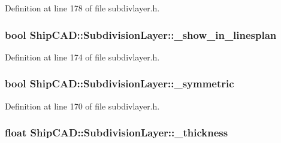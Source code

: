 Definition at line 178 of file subdivlayer.\+h.

\subsubsection[{\texorpdfstring{\+\_\+show\+\_\+in\+\_\+linesplan}{_show_in_linesplan}}]{\setlength{\rightskip}{0pt plus 5cm}bool Ship\+C\+A\+D\+::\+Subdivision\+Layer\+::\+\_\+show\+\_\+in\+\_\+linesplan\hspace{0.3cm}{\ttfamily [protected]}}\hypertarget{classShipCAD_1_1SubdivisionLayer_a373fd987b5f973a995517e7f97fda5ac}{}\label{classShipCAD_1_1SubdivisionLayer_a373fd987b5f973a995517e7f97fda5ac}


Definition at line 174 of file subdivlayer.\+h.

\subsubsection[{\texorpdfstring{\+\_\+symmetric}{_symmetric}}]{\setlength{\rightskip}{0pt plus 5cm}bool Ship\+C\+A\+D\+::\+Subdivision\+Layer\+::\+\_\+symmetric\hspace{0.3cm}{\ttfamily [protected]}}\hypertarget{classShipCAD_1_1SubdivisionLayer_aaeddcdf1d08d84c76c5453f4a71fbe7a}{}\label{classShipCAD_1_1SubdivisionLayer_aaeddcdf1d08d84c76c5453f4a71fbe7a}


Definition at line 170 of file subdivlayer.\+h.

\subsubsection[{\texorpdfstring{\+\_\+thickness}{_thickness}}]{\setlength{\rightskip}{0pt plus 5cm}float Ship\+C\+A\+D\+::\+Subdivision\+Layer\+::\+\_\+thickness\hspace{0.3cm}{\ttfamily [protected]}}\hypertarget{classShipCAD_1_1SubdivisionLayer_a00a308fdf03a0c1d9a6fa65f965e7942}{}\label{classShipCAD_1_1SubdivisionLayer_a00a308fdf03a0c1d9a6fa65f965e7942}


